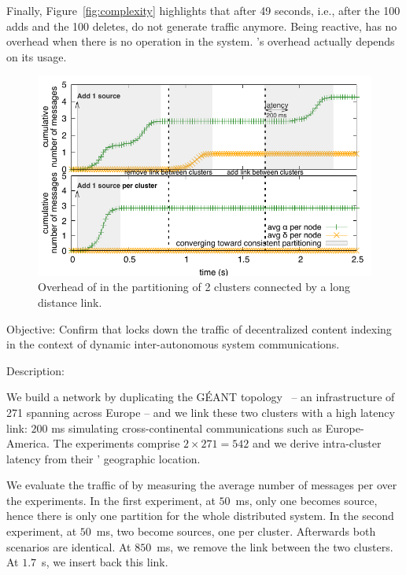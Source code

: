 \begin{asparadesc}
\noindent Finally, Figure~\ref{fig:complexity} highlights that after
49 seconds, i.e., after the 100 adds and the 100 deletes, \processes
do not generate traffic anymore. Being reactive, \NAME has no overhead
when there is no operation in the system. \NAME's overhead actually
depends on its usage.

\end{asparadesc}



\begin{asparadesc}

\begin{figure}
  \centering\includegraphics[width=\FIGSCALE\columnwidth]{img/as_cast_geant.pdf}
  \caption{\label{fig:geant}Overhead of \NAME in the partitioning of 2
    clusters connected by a long distance link.}
\end{figure}

  
\item [Objective:] Confirm that \NAME locks down the traffic of
  decentralized content indexing in the context of dynamic
  inter-autonomous system communications.
  
\item [Description:]

We build a network by duplicating the G{\'E}ANT
topology~\cite{knight2011internet} -- an infrastructure of 271 \nodes
spanning across Europe -- and we link these two clusters with a high
latency link: $200$ ms simulating cross-continental communications
such as Europe-America. The experiments comprise $2 \times 271 = 542$
\processes and we derive intra-cluster latency from their \processes'
geographic location.

\noindent We evaluate the traffic of \NAME by measuring the average
number of messages per \process over the experiments. In the first
experiment, at $50$~ms, only one \process becomes source, hence there
is only one partition for the whole distributed system. In the second
experiment, at $50$~ms, two \processes become sources, one per
cluster. Afterwards both scenarios are identical. At $850$~ms, we
remove the link between the two clusters. At $1.7$~s, we insert back
this link.


\end{asparadesc}

